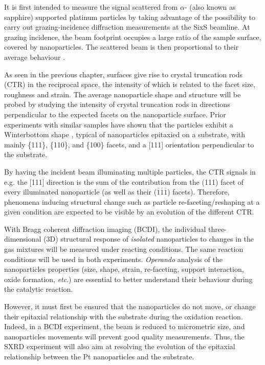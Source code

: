 It is first intended to measure the signal scattered from $\alpha$- (also known as sapphire) supported platinum particles by taking advantage of the possibility to carry out grazing-incidence diffraction measurements at the SixS beamline.
At grazing incidence, the beam footprint occupies a large ratio of the sample surface, covered by nanoparticles.
The scattered beam is then proportional to their average behaviour \parencite{Nolte2008, Hejral2013, Hejral2016}.

As seen in the previous chapter, surfaces give rise to crystal truncation rods (CTR) in the reciprocal space, the intensity of which is related to the facet size, roughness and strain.
The average nanoparticle shape and structure will be probed by studying the intensity of crystal truncation rods in directions perpendicular to the expected facets on the nanoparticle surface.
Prior experiments with similar samples \parencite{Dupraz2017, Li2020, Lim2021, Dupraz2022} have shown that the particles exhibit a Winterbottom shape \parencite{Winterbottom1967, Boukouvala2021}, typical of nanoparticles epitaxied on a substrate, with mainly \{111\}, \{110\}, and \{100\} facets, and a [111] orientation perpendicular to the substrate.

By having the incident beam illuminating multiple particles, the CTR signals in e.g. the [111] direction is the sum of the contribution from the (111) facet of every illuminated nanoparticle (as well as their ($\bar{1}\bar{1}\bar{1}$) facets).
Therefore, phenomena inducing structural change such as particle re-faceting/reshaping at a given condition are expected to be visible by an evolution of the different CTR.

With Bragg coherent diffraction imaging (BCDI), the individual three-dimensional (3D) structural response of \textit{isolated} nanoparticles to changes in the gas mixtures will be measured under reacting conditions.
The same reaction conditions will be used in both experiments.
\textit{Operando} analysis of the nanoparticles properties (size, shape, strain, re-faceting, support interaction, oxide formation, \textit{etc}.) are essential to better understand their behaviour during the catalytic reaction.

However, it must first be ensured that the nanoparticles do not move, or change their epitaxial relationship with the substrate during the oxidation reaction.
Indeed, in a BCDI experiment, the beam is reduced to micrometric size, and nanoparticles movements will prevent good quality measurements.
Thus, the SXRD experiment will also aim at resolving the evolution of the epitaxial relationship between the Pt nanoparticles and the  substrate.

